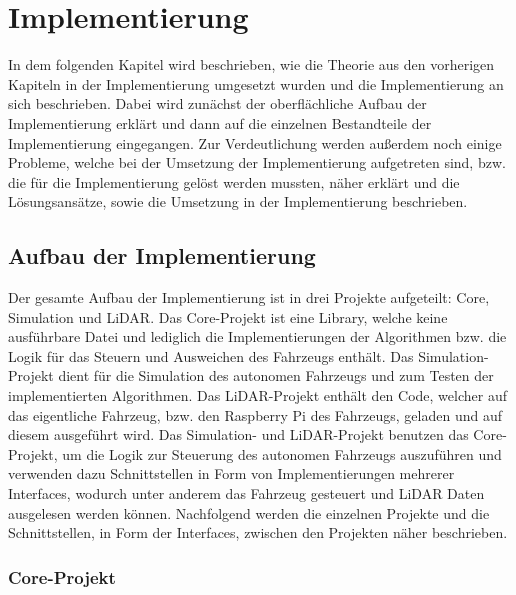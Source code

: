 \section{Implementierung}

In dem folgenden Kapitel wird beschrieben, wie die Theorie aus den vorherigen Kapiteln in der Implementierung umgesetzt wurden und die Implementierung an sich beschrieben. Dabei wird zunächst der oberflächliche Aufbau der Implementierung erklärt und dann auf die einzelnen Bestandteile der Implementierung eingegangen. Zur Verdeutlichung werden außerdem noch einige Probleme, welche bei der Umsetzung der Implementierung aufgetreten sind, bzw. die für die Implementierung gelöst werden mussten, näher erklärt und die Lösungsansätze, sowie die Umsetzung in der Implementierung beschrieben. 

\subsection{Aufbau der Implementierung}

Der gesamte Aufbau der Implementierung ist in drei Projekte aufgeteilt: Core, Simulation und LiDAR. Das Core-Projekt ist eine Library, welche keine ausführbare Datei und lediglich die Implementierungen der Algorithmen bzw. die Logik für das Steuern und Ausweichen des Fahrzeugs enthält. Das Simulation-Projekt dient für die Simulation des autonomen Fahrzeugs und zum Testen der implementierten Algorithmen. Das LiDAR-Projekt enthält den Code, welcher auf das eigentliche Fahrzeug, bzw. den Raspberry Pi des Fahrzeugs, geladen und auf diesem ausgeführt wird. Das Simulation- und LiDAR-Projekt benutzen das Core-Projekt, um die Logik zur Steuerung des autonomen Fahrzeugs auszuführen und verwenden dazu Schnittstellen in Form von Implementierungen mehrerer Interfaces, wodurch unter anderem das Fahrzeug gesteuert und LiDAR Daten ausgelesen werden können. Nachfolgend werden die einzelnen Projekte und die Schnittstellen, in Form der Interfaces, zwischen den Projekten näher beschrieben. 

\subsubsection{Core-Projekt}


